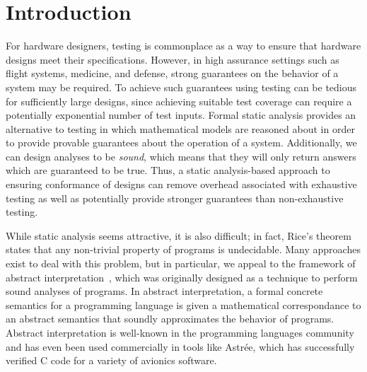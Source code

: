 \documentclass[10pt,conference]{IEEEtran}
\begin{document}




%
\IEEEpeerreviewmaketitle



\section{Introduction}
For hardware designers, testing is commonplace as a way to ensure
that hardware designs meet their specifications. However, in
high assurance settings such as flight systems, medicine, and
defense, strong guarantees on the behavior of a system may be
required. To achieve such guarantees using testing can be tedious
for sufficiently large designs, since achieving suitable test
coverage can require a potentially exponential number of test inputs.
Formal static analysis provides an alternative to testing in which
mathematical models are reasoned about in order to provide provable
guarantees about the operation of a system. Additionally, we can
design analyses to be \emph{sound}, which means that they will only
return answers which are guaranteed to be true. Thus, a static analysis-based 
approach to ensuring conformance of designs can
remove overhead associated with exhaustive testing as well as potentially provide
stronger guarantees than non-exhaustive testing.

While static analysis seems attractive, it is also difficult;
in fact, Rice's theorem states that any non-trivial property of
programs is undecidable. Many approaches exist to deal with this problem,
but in particular, we appeal to the framework of abstract interpretation~\cite{cc77},
which was originally designed as a technique to perform sound analyses
of programs. In abstract interpretation, a formal concrete semantics for a
programming language is given a mathematical correspondance to an abstract
semantics that soundly approximates the behavior of programs.
Abstract interpretation is well-known in the programming
languages community and has even been used commercially in tools like
{\sc Astr\'ee}, which has successfully verified C code for a variety
of avionics software.
\end{document}
